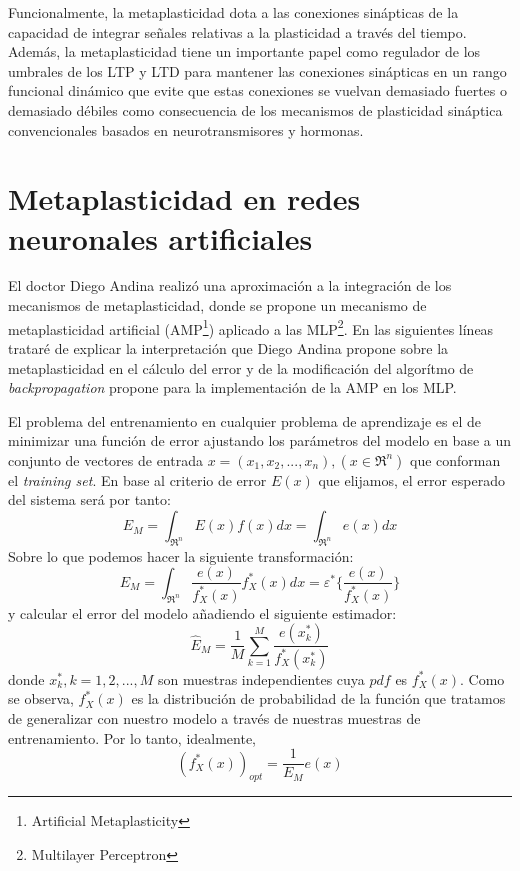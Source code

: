 \documentclass[10pt,a4paper]{report}
\begin{document}
Funcionalmente, la metaplasticidad dota a las conexiones sinápticas de la capacidad de integrar señales relativas a la plasticidad a través del tiempo. Además, la metaplasticidad tiene un importante papel como regulador de los umbrales de los LTP y LTD para mantener las conexiones sinápticas en un rango funcional dinámico que evite que estas conexiones se vuelvan demasiado fuertes o demasiado débiles como consecuencia de los mecanismos de plasticidad sináptica convencionales basados en neurotransmisores y hormonas.

\section{Metaplasticidad en redes neuronales artificiales}
El doctor Diego Andina realizó una aproximación a la integración de los mecanismos de metaplasticidad\citep{Andina2009}, donde se propone un mecanismo de metaplasticidad artificial (AMP\footnote{Artificial Metaplasticity}) aplicado a las MLP\footnote{Multilayer Perceptron}. En las siguientes líneas trataré de explicar la interpretación que Diego Andina propone sobre la metaplasticidad en el cálculo del error y de la modificación del algorítmo de \textit{backpropagation} propone para la implementación de la AMP en los MLP.

El problema del entrenamiento en cualquier problema de aprendizaje es el de minimizar una función de error ajustando los parámetros del modelo en base a un conjunto de vectores de entrada $x=(x_1,x_2,...,x_n),(x\in\Re^n)$ que conforman el \textit{training set}. En base al criterio de error $E(x)$ que elijamos, el error esperado del sistema será por tanto:
\begin{equation}
	E_M = \int_{\Re^n}E(x)f(x)dx = \int_{\Re^n}e(x)dx
\end{equation} 
Sobre lo que podemos hacer la siguiente transformación:
\begin{equation}
	\label{metaSub1}
	E_M = \int_{\Re^n}\dfrac{e(x)}{f^*_X(x)}f^*_X(x)dx = \varepsilon^*\lbrace\dfrac{e(x)}{f^*_X(x)}\rbrace
\end{equation}
y calcular el error del modelo añadiendo el siguiente estimador:
\begin{equation}
	\label{metaSub2}
	\widehat{E}_M=\dfrac{1}{M}\sum^M_{k=1}\dfrac{e(x^*_k)}{f^*_X(x^*_k)}
\end{equation}
donde $x^*_k,k=1,2,...,M$ son muestras independientes cuya $pdf$ es $f^*_X(x)$. Como se observa, $f^*_X(x)$ es la distribución de probabilidad de la función que tratamos de generalizar con nuestro modelo a través de nuestras muestras de entrenamiento. Por lo tanto, idealmente, 
\begin{equation}
	\label{metaSub3}
	(f^*_X(x))_{opt}=\dfrac{1}{E_M}e(x)
\end{equation}
\end{document}
